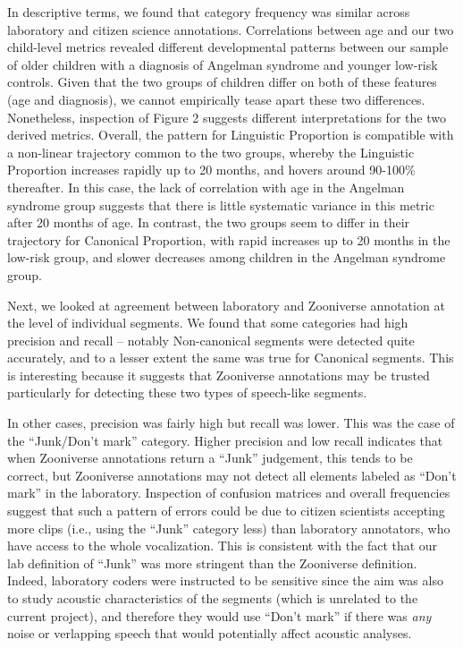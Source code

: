 \documentclass[english,,man,floatsintext]{apa6}
\begin{document}
In descriptive terms, we found that category frequency was similar across laboratory and citizen science annotations. Correlations between age and our two child-level metrics revealed different developmental patterns between our sample of older children with a diagnosis of Angelman syndrome and younger low-risk controls. Given that the two groups of children differ on both of these features (age and diagnosis), we cannot empirically tease apart these two differences. Nonetheless, inspection of Figure 2 suggests different interpretations for the two derived metrics. Overall, the pattern for Linguistic Proportion is compatible with a non-linear trajectory common to the two groups, whereby the Linguistic Proportion increases rapidly up to 20 months, and hovers around 90-100\% thereafter. In this case, the lack of correlation with age in the Angelman syndrome group suggests that there is little systematic variance in this metric after 20 months of age. In contrast, the two groups seem to differ in their trajectory for Canonical Proportion, with rapid increases up to 20 months in the low-risk group, and slower decreases among children in the Angelman syndrome group.

Next, we looked at agreement between laboratory and Zooniverse annotation at the level of individual segments. We found that some categories had high precision and recall -- notably Non-canonical segments were detected quite accurately, and to a lesser extent the same was true for Canonical segments. This is interesting because it suggests that Zooniverse annotations may be trusted particularly for detecting these two types of speech-like segments.

In other cases, precision was fairly high but recall was lower. This was the case of the \enquote{Junk/Don't mark} category. Higher precision and low recall indicates that when Zooniverse annotations return a \enquote{Junk} judgement, this tends to be correct, but Zooniverse annotations may not detect all elements labeled as \enquote{Don't mark} in the laboratory. Inspection of confusion matrices and overall frequencies suggest that such a pattern of errors could be due to citizen scientists accepting more clips (i.e., using the \enquote{Junk} category less) than laboratory annotators, who have access to the whole vocalization. This is consistent with the fact that our lab definition of \enquote{Junk} was more stringent than the Zooniverse definition. Indeed, laboratory coders were instructed to be sensitive since the aim was also to study acoustic characteristics of the segments (which is unrelated to the current project), and therefore they would use \enquote{Don't mark} if there was \emph{any} noise or verlapping speech that would potentially affect acoustic analyses.
\end{document}
